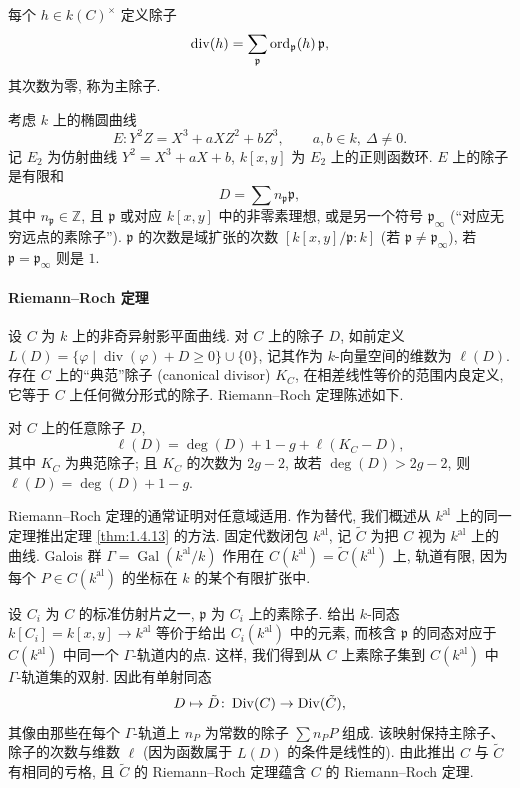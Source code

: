 每个 $h\in k(C)^{\times}$ 定义除子
\[
\operatorname{div}(h) = \sum_{\mathfrak{p}}\operatorname*{ord}\nolimits_\mathfrak{p}(h)\,\mathfrak{p},
\]
其次数为零, 称为主除子.

\begin{example} \label{thm:1.4.12} 
考虑 $k$ 上的椭圆曲线
\[
E\colon Y^2Z = X^3 + aXZ^2 + bZ^3, \qquad a,b\in k, \ \Delta\neq 0.
\]
记 $E_2$ 为仿射曲线 $Y^2 = X^3 + aX + b$, $k[x,y]$ 为 $E_2$ 上的正则函数环. $E$ 上的除子是有限和
\[
D = \sum n_\mathfrak{p}\mathfrak{p},
\]
其中 $n_\mathfrak{p}\in\mathbb{Z}$, 且 $\mathfrak{p}$ 或对应 $k[x,y]$ 中的非零素理想, 或是另一个符号 $\mathfrak{p}_\infty$ (``对应无穷远点的素除子''). $\mathfrak{p}$ 的次数是域扩张的次数 $[k[x,y]/\mathfrak{p}:k]$ (若 $\mathfrak{p}\neq\mathfrak{p}_\infty$), 若 $\mathfrak{p} = \mathfrak{p}_\infty$ 则是 $1$.
\end{example}

\paragraph{Riemann--Roch 定理}
设 $C$ 为 $k$ 上的非奇异射影平面曲线. 对 $C$ 上的除子 $D$, 如前定义 $L(D) = \{\varphi \mid \operatorname{div}(\varphi) + D\ge 0\}\cup\{0\}$, 记其作为 $k$-向量空间的维数为 $\ell(D)$. 存在 $C$ 上的``典范''除子 (canonical divisor) $K_C$, 在相差线性等价的范围内良定义, 它等于 $C$ 上任何微分形式的除子. Riemann--Roch 定理陈述如下.

\begin{theorem} \label{thm:1.4.13} 
对 $C$ 上的任意除子 $D$,
\[
\ell(D) = \deg(D) + 1 - g + \ell(K_C - D),
\]
其中 $K_C$ 为典范除子; 且 $K_C$ 的次数为 $2g-2$, 故若 $\deg(D) > 2g-2$, 则 $\ell(D) = \deg(D) + 1 - g$.
\end{theorem}

Riemann--Roch 定理的通常证明对任意域适用. 作为替代, 我们概述从 $k^{\mathrm{al}}$ 上的同一定理推出定理 \ref{thm:1.4.13} 的方法. 固定代数闭包 $k^{\mathrm{al}}$, 记 $\tilde{C}$ 为把 $C$ 视为 $k^{\mathrm{al}}$ 上的曲线. Galois 群 $\Gamma = \operatorname{Gal}(k^{\mathrm{al}}/k)$ 作用在 $C(k^{\mathrm{al}}) = \tilde{C}(k^{\mathrm{al}})$ 上, 轨道有限, 因为每个 $P\in C(k^{\mathrm{al}})$ 的坐标在 $k$ 的某个有限扩张中.

设 $C_i$ 为 $C$ 的标准仿射片之一, $\mathfrak{p}$ 为 $C_i$ 上的素除子. 给出 $k$-同态 $k[C_i] = k[x,y]\to k^{\mathrm{al}}$ 等价于给出 $C_i(k^{\mathrm{al}})$ 中的元素, 而核含 $\mathfrak{p}$ 的同态对应于 $C(k^{\mathrm{al}})$ 中同一个 $\Gamma$-轨道内的点. 这样, 我们得到从 $C$ 上素除子集到 $C(k^{\mathrm{al}})$ 中 $\Gamma$-轨道集的双射. 因此有单射同态
\[
D\mapsto\tilde{D}\colon\operatorname{Div}(C)\to\operatorname{Div}(\tilde{C}),
\]
其像由那些在每个 $\Gamma$-轨道上 $n_P$ 为常数的除子 $\sum n_PP$ 组成. 该映射保持主除子、除子的次数与维数 $\ell$ (因为函数属于 $L(D)$ 的条件是线性的). 由此推出 $C$ 与 $\tilde{C}$ 有相同的亏格, 且 $\tilde{C}$ 的 Riemann--Roch 定理蕴含 $C$ 的 Riemann--Roch 定理.

